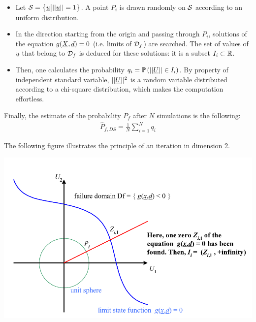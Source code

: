 {  \begin{itemize}
  \item Let ${\mathcal S} = \big\{ {\underline{u}} \big| ||{\underline{u}}|| = 1 \big\}$. A point $P_i$ is drawn randomly on ${\mathcal S}$ according to an uniform distribution.
  \item In the direction starting from the origin and passing through $P_i$, solutions of the equation $g({\underline{X}},{\underline{d}}) = 0$ (i.e. limits of ${\mathcal D}_f$) are searched. The set of values of $\underline{u}$ that belong to ${\mathcal D}_f$ is deduced for these solutions: it is a subset $I_i \subset {\mathbb R}$.
  \item Then, one calculates the probability $q_i = {\mathbb P}\left(  ||{\underline{U}}|| \in I_i  \right)$. By property of independent standard variable, $||{\underline{U}}||^2$ is a random variable distributed according to a chi-square distribution, which makes the computation effortless.
  \end{itemize}
  Finally, the estimate of the probability $P_f$ after $N$ simulations is the following:
  \begin{align*}
    \widehat{P}_{f,DS} = \frac{1}{N} \sum_{i=1}^N q_i
  \end{align*}

  The following figure illustrates the principle of an iteration in dimension 2.

  \begin{center}
    \includegraphics[scale=1]{Figures/Sdir.pdf}
  \end{center}

}
